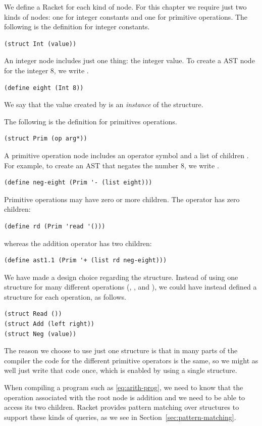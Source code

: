 \documentclass[11pt]{book}
\begin{document}
We define a Racket  for each kind of node. For this
chapter we require just two kinds of nodes: one for integer constants
and one for primitive operations. The following is the 
definition for integer constants.
\begin{lstlisting}
(struct Int (value))
\end{lstlisting}
An integer node includes just one thing: the integer value.
To create a AST node for the integer $8$, we write .
\begin{lstlisting}
(define eight (Int 8))
\end{lstlisting}
We say that the value created by  is an
\emph{instance} of the  structure.

The following is the  definition for primitives operations.
\begin{lstlisting}
(struct Prim (op arg*))
\end{lstlisting}
A primitive operation node includes an operator symbol 
and a list of children . For example, to create
an AST that negates the number $8$, we write .
\begin{lstlisting}
(define neg-eight (Prim '- (list eight)))
\end{lstlisting}
Primitive operations may have zero or more children. The 
operator has zero children:
\begin{lstlisting}
(define rd (Prim 'read '()))
\end{lstlisting}
whereas the addition operator has two children:
\begin{lstlisting}
(define ast1.1 (Prim '+ (list rd neg-eight)))
\end{lstlisting}

We have made a design choice regarding the  structure.
Instead of using one structure for many different operations
(, \code{+}, and \code{-}), we could have instead defined a
structure for each operation, as follows.
\begin{lstlisting}
(struct Read ())
(struct Add (left right))
(struct Neg (value))
\end{lstlisting}
The reason we choose to use just one structure is that in many parts
of the compiler the code for the different primitive operators is the
same, so we might as well just write that code once, which is enabled
by using a single structure.

When compiling a program such as \eqref{eq:arith-prog}, we need to
know that the operation associated with the root node is addition and
we need to be able to access its two children. Racket provides pattern
matching over structures to support these kinds of queries, as we
see in Section~\ref{sec:pattern-matching}.
\end{document}
